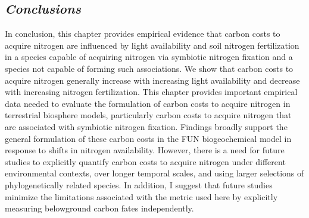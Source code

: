 \subsection{\textit{Conclusions}}
\noindent In conclusion, this chapter provides empirical evidence that carbon costs to acquire nitrogen are influenced by light availability and soil nitrogen fertilization in a species capable of acquiring nitrogen via symbiotic nitrogen fixation and a species not capable of forming such associations. We show that carbon costs to acquire nitrogen generally increase with increasing light availability and decrease with increasing nitrogen fertilization. This chapter provides important empirical data needed to evaluate the formulation of carbon costs to acquire nitrogen in terrestrial biosphere models, particularly carbon costs to acquire nitrogen that are associated with symbiotic nitrogen fixation. Findings broadly support the general formulation of these carbon costs in the FUN biogeochemical model in response to shifts in nitrogen availability. However, there is a need for future studies to explicitly quantify carbon costs to acquire nitrogen under different environmental contexts, over longer temporal scales, and using larger selections of phylogenetically related species. In addition, I suggest that future studies minimize the limitations associated with the metric used here by explicitly measuring belowground carbon fates independently.